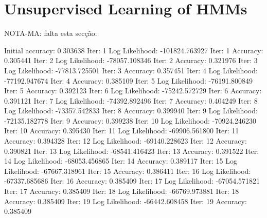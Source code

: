 \section{Unsupervised Learning of HMMs}

NOTA-MA: falta esta secção.


\begin{python}

Initial accuracy: 0.303638
Iter: 1 Log Likelihood: -101824.763927
Iter: 1 Accuracy: 0.305441
Iter: 2 Log Likelihood: -78057.108346
Iter: 2 Accuracy: 0.321976
Iter: 3 Log Likelihood: -77813.725501
Iter: 3 Accuracy: 0.357451
Iter: 4 Log Likelihood: -77192.947674
Iter: 4 Accuracy: 0.385109
Iter: 5 Log Likelihood: -76191.800849
Iter: 5 Accuracy: 0.392123
Iter: 6 Log Likelihood: -75242.572729
Iter: 6 Accuracy: 0.391121
Iter: 7 Log Likelihood: -74392.892496
Iter: 7 Accuracy: 0.404249
Iter: 8 Log Likelihood: -73357.542833
Iter: 8 Accuracy: 0.399940
Iter: 9 Log Likelihood: -72135.182778
Iter: 9 Accuracy: 0.399238
Iter: 10 Log Likelihood: -70924.246230
Iter: 10 Accuracy: 0.395430
Iter: 11 Log Likelihood: -69906.561800
Iter: 11 Accuracy: 0.394328
Iter: 12 Log Likelihood: -69140.228623
Iter: 12 Accuracy: 0.390821
Iter: 13 Log Likelihood: -68541.416423
Iter: 13 Accuracy: 0.391522
Iter: 14 Log Likelihood: -68053.456865
Iter: 14 Accuracy: 0.389117
Iter: 15 Log Likelihood: -67667.318961
Iter: 15 Accuracy: 0.386411
Iter: 16 Log Likelihood: -67337.685686
Iter: 16 Accuracy: 0.385409
Iter: 17 Log Likelihood: -67054.571821
Iter: 17 Accuracy: 0.385409
Iter: 18 Log Likelihood: -66769.973881
Iter: 18 Accuracy: 0.385409
Iter: 19 Log Likelihood: -66442.608458
Iter: 19 Accuracy: 0.385409

\end{python}